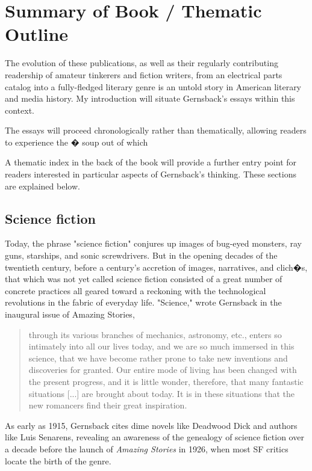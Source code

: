 \documentclass{article}
\begin{document}
\section{Summary of Book / Thematic Outline}

The evolution of these publications, as well as their regularly contributing readership of amateur tinkerers and fiction writers, from an electrical parts catalog into a fully-fledged literary genre is an untold story in American literary and media history.  My introduction will situate Gernsback's essays within this context.

The essays will proceed chronologically rather than thematically, allowing readers to experience the � soup out of which 

A thematic index in the back of the book will provide a further entry point for readers interested in particular aspects of Gernsback's thinking.  These sections are explained below.

\subsection{Science fiction}

Today, the phrase "science fiction" conjures up images of bug-eyed monsters, ray guns, starships, and sonic screwdrivers.  But in the opening decades of the twentieth century, before a century's accretion of images, narratives, and clich�s, that which was not yet called science fiction consisted of a great number of concrete practices all geared toward a reckoning with the technological revolutions in the fabric of everyday life.  "Science," wrote Gernsback in the inaugural issue of Amazing Stories, 
\begin{quote}
through its various branches of mechanics, astronomy, etc., enters so intimately into all our lives today, and we are so much immersed in this science, that we have become rather prone to take new inventions and discoveries for granted. Our entire mode of living has been changed with the present progress, and it is little wonder, therefore, that many fantastic situations [...] are brought about today. It is in these situations that the new romancers find their great inspiration.\autocite{gernsback_new_1926}
\end{quote}

As early as 1915, Gernsback cites dime novels like Deadwood Dick and authors like Luis Senarens, revealing an awareness of the genealogy of science fiction over a decade before the launch of \textit{Amazing Stories} in 1926, when most SF critics locate the birth of the genre.
\end{document}

